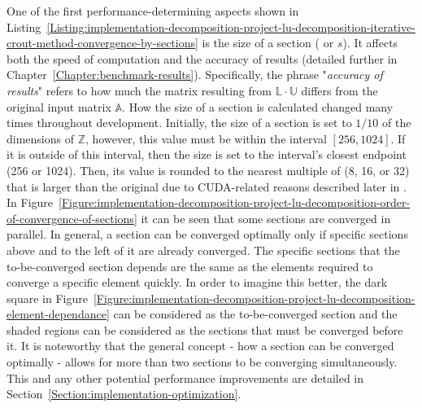 One of the first performance-determining aspects shown in Listing~\ref{Listing:implementation-decomposition-project-lu-decomposition-iterative-crout-method-convergence-by-sections} is the size of a section ( or $ s $). It affects both the speed of computation and the accuracy of results (detailed further in Chapter~\ref{Chapter:benchmark-results}). Specifically, the phrase "\textit{accuracy of results}" refers to how much the matrix resulting from $ \mathbb{L}\cdot\mathbb{U} $ differs from the original input matrix $ \mathbb{A} $. How the size of a section is calculated changed many times throughout development. Initially, the size of a section is set to $ 1/10 $ of the dimensions of $ \mathbb{Z} $, however, this value must be within the interval $ \left[256, 1024\right] $. If it is outside of this interval, then the size is set to the interval's closest endpoint (256 or 1024). Then, its value is rounded to the nearest multiple of  (8, 16, or 32) that is larger than the original  due to CUDA-related reasons described later in \textit{}. \\
In Figure~\ref{Figure:implementation-decomposition-project-lu-decomposition-order-of-convergence-of-sections} it can be seen that some sections are converged in parallel. In general, a section can be converged optimally only if specific sections above and to the left of it are already converged. The specific sections that the to-be-converged section depends are the same as the elements required to converge a specific element quickly. In order to imagine this better, the dark square in Figure~\ref{Figure:implementation-decomposition-project-lu-decomposition-element-dependance} can be considered as the to-be-converged section and the shaded regions can be considered as the sections that must be converged before it. It is noteworthy that the general concept - how a section can be converged optimally - allows for more than two sections to be converging simultaneously. This and any other potential performance improvements are detailed in Section~\ref{Section:implementation-optimization}. \\
